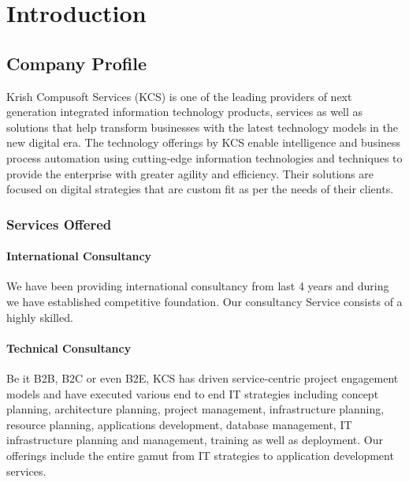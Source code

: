 \chapter{Introduction}



\section{Company Profile}

Krish Compusoft Services (KCS) is one of the leading providers of next generation integrated information technology products, services as well as solutions that help transform businesses with the latest technology models in the new digital era. The technology offerings by KCS enable intelligence and business process automation using cutting-edge information technologies and techniques to provide the enterprise with greater agility and efficiency. Their solutions are focused on digital strategies that are custom fit as per the needs of their clients.


\subsection{ Services Offered }
\subsubsection{International Consultancy}
We have been providing international consultancy from last 4 years and during we have established competitive foundation. Our consultancy Service consists of a highly skilled.



\subsubsection{Technical Consultancy}
Be it B2B, B2C or even B2E, KCS has driven service-centric project engagement models and have executed various end to end IT strategies including concept planning, architecture planning, project management, infrastructure planning, resource planning, applications development, database management, IT infrastructure planning and management, training as well as deployment. Our offerings include the entire gamut from IT strategies to application development services.



